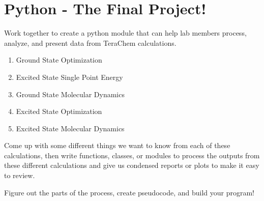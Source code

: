 \section{Python - The Final Project!}

Work together to create a python module that can help lab members
process, analyze, and present data from TeraChem calculations.

\begin{enumerate}
\def\labelenumi{\arabic{enumi}.}
\tightlist
\item
  Ground State Optimization
\item
  Excited State Single Point Energy
\item
  Ground State Molecular Dynamics
\item
  Excited State Optimization
\item
  Excited State Molecular Dynamics
\end{enumerate}

Come up with some different things we want to know from each of these
calculations, then write functions, classes, or modules to process the
outputs from these different calculations and give us condensed reports
or plots to make it easy to review.

Figure out the parts of the process, create pseudocode, and build your
program!
